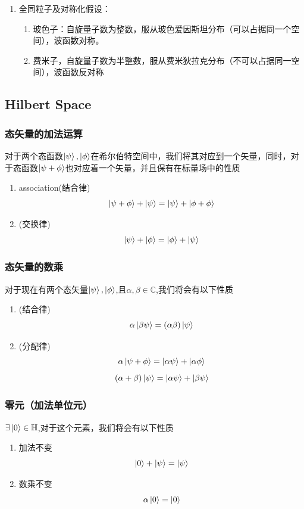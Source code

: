\documentclass{article}
\newcommand{\bb}[1]{\mathbb{#1}}
\begin{document}
\begin{enumerate}
\begin{enumerate}
\begin{equation*}
			            \frac{d\hat{f_H}}{dt} = \left(\frac{\partial\hat{f_S}}{\partial t}\right)_H+\frac{1}{i\hbar}\left[\hat{f_H},\hat{H}\right]
		            \end{equation*}
	      \end{enumerate}
	\item[(5)] 全同粒子及对称化假设：
	      \begin{enumerate}
		      \item[a] 玻色子：自旋量子数为整数，服从玻色爱因斯坦分布（可以占据同一个空间），波函数对称。
		      \item[b] 费米子，自旋量子数为半整数，服从费米狄拉克分布（不可以占据同一空间），波函数反对称
	      \end{enumerate}
\end{enumerate}

\subsection{Hilbert Space}

\subsubsection{态矢量的加法运算}
对于两个态函数$\displaystyle\ket{\psi},\ket{\phi}$在希尔伯特空间中，我们将其对应到一个矢量，同时，对于态函数$\displaystyle\ket{\psi+\phi}$也对应着一个矢量，并且保有在标量场中的性质
\begin{enumerate}
	\item association(结合律) \[\ket{\psi+\phi}+\ket{\psi}=\ket{\psi}+\ket{\phi+\phi}\]
	\item (交换律)\[\ket{\psi}+\ket{\phi}=\ket{\phi}+\ket{\psi}\]
\end{enumerate}

\subsubsection{态矢量的数乘}
对于现在有两个态矢量$\ket{\psi},\ket{\phi}$,且$\alpha,\beta\in\mathbb{C}$,我们将会有以下性质
\begin{enumerate}
	\item (结合律)\[\alpha\ket{\beta\psi}=(\alpha\beta)\ket{\psi}\]
	\item (分配律)\[\alpha\ket{\psi+\phi}=\ket{\alpha\psi}+\ket{\alpha\phi}\]\[(\alpha+\beta)\ket{\psi}=\ket{\alpha\psi}+\ket{\beta\psi}\]
\end{enumerate}


\subsubsection{零元（加法单位元）}
$\exists\ket{0}\in\bb{H}$,对于这个元素，我们将会有以下性质
\begin{enumerate}
	\item 加法不变\[\ket{0}+\ket{\psi}=\ket{\psi}\]
	\item 数乘不变\[\alpha\ket{0}=\ket{0}\]
\end{enumerate}
\end{document}
